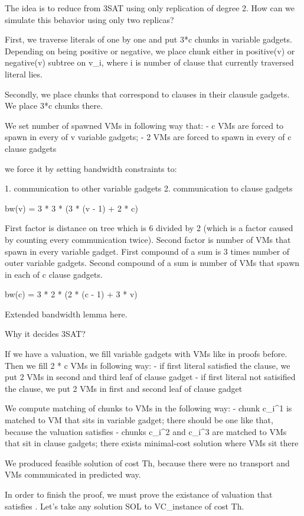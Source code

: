 The idea is to reduce from 3SAT using only replication of degree
2. How can we simulate this behavior using only two replicas?

First, we traverse literals of \Psi one by one and put 3*c chunks in
variable gadgets. Depending on being positive or negative, we place
chunk either in positive(v) or negative(v) subtree on v_i, where i is
number of clause that currently traversed literal lies.

Secondly, we place chunks that correspond to clauses in their clausule
gadgets. We place 3*c chunks there.

We set number of spawned VMs in following way that:
- c VMs are forced to spawn in every of v variable gadgets;
- 2 VMs are forced to spawn in every of c clause gadgets

 we force
it by setting bandwidth constraints to:

1. communication to other variable gadgets 
2. communication to clause gadgets

bw(v) = 3 * 3 * (3 * (v - 1) + 2 * c)

First factor is distance on tree which is 6 divided by 2 (which is a
factor caused by counting every communication twice). Second factor is
number of VMs that spawn in every variable gadget. First compound of a
sum is 3 times number of outer variable gadgets. Second compound of a
sum is number of VMs that spawn in each of c clause gadgets.

bw(c) = 3 * 2 * (2 * (c - 1) + 3 * v)

Extended bandwidth lemma here.

Why it decides 3SAT?

If we have a valuation, we fill variable gadgets with VMs like in
proofs before. Then we fill 2 * c VMs in following way:
- if first literal satisfied the clause, we put 2 VMs in second and
third leaf of clause gadget
- if first literal not satisified the clause, we put 2 VMs in first
and second leaf of clause gadget

We compute matching of chunks to VMs in the following way:
- chunk c_i^1 is matched to VM that sits in variable gadget; there
should be one like that, because the valuation satisfies
- chunks c_i^2 and c_i^3 are matched to VMs that sit in clause
gadgets; there exists minimal-cost solution where VMs sit there

We produced feasible solution of cost Th, because there were no
transport and VMs communicated in predicted way.

 In order to finish the proof, we must prove the existance of
 valuation that satisfies \Phi. 
Let's take any solution SOL to VC_\Psi instance of cost \leq Th.

